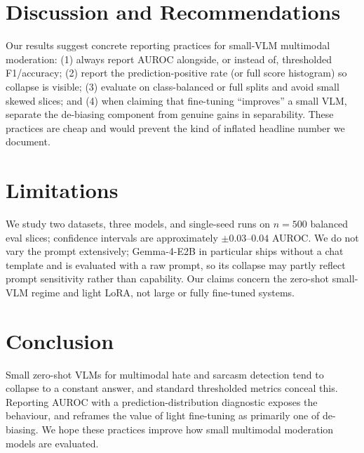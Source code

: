 \documentclass[sigconf,nonacm]{acmart}
\begin{document}
\section{Discussion and Recommendations}
Our results suggest concrete reporting practices for small-VLM multimodal moderation:
(1) always report AUROC alongside, or instead of, thresholded F1/accuracy; (2) report
the prediction-positive rate (or full score histogram) so collapse is visible; (3)
evaluate on class-balanced or full splits and avoid small skewed slices; and (4) when
claiming that fine-tuning ``improves'' a small VLM, separate the de-biasing component
from genuine gains in separability. These practices are cheap and would prevent the kind
of inflated headline number we document.

\section{Limitations}
We study two datasets, three models, and single-seed runs on $n{=}500$ balanced eval
slices; confidence intervals are approximately $\pm0.03$--$0.04$ AUROC. We do not vary
the prompt extensively; Gemma-4-E2B in particular ships without a chat template and is
evaluated with a raw prompt, so its collapse may partly reflect prompt sensitivity rather
than capability. Our claims concern the zero-shot small-VLM regime and light LoRA, not
large or fully fine-tuned systems.

\section{Conclusion}
Small zero-shot VLMs for multimodal hate and sarcasm detection tend to collapse to a
constant answer, and standard thresholded metrics conceal this. Reporting AUROC with a
prediction-distribution diagnostic exposes the behaviour, and reframes the value of
light fine-tuning as primarily one of de-biasing. We hope these practices improve how
small multimodal moderation models are evaluated.



\end{document}

